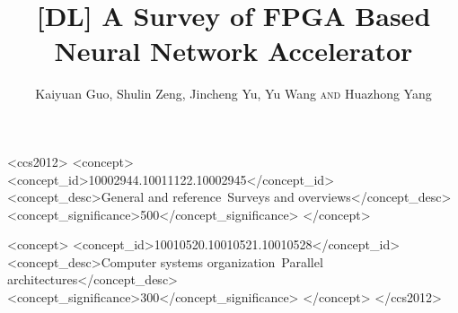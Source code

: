 \documentclass[acmsmall]{acmart}
\begin{document}
\title{[DL] A Survey of FPGA Based Neural Network Accelerator} 

\author{Kaiyuan Guo, Shulin Zeng, Jincheng Yu, Yu Wang {\scshape and} Huazhong Yang}



%
%



\begin{CCSXML}  
  <ccs2012>  
  <concept>  
  <concept_id>10002944.10011122.10002945</concept_id>
   <concept_desc>General and reference~Surveys and overviews</concept_desc>  
  <concept_significance>500</concept_significance>
  </concept>
  
  <concept>  
  <concept_id>10010520.10010521.10010528</concept_id>
   <concept_desc>Computer systems organization~Parallel architectures</concept_desc> 
  <concept_significance>300</concept_significance>
  </concept>
  </ccs2012>  
\end{CCSXML}  
  
%
%



\end{document}
